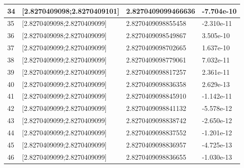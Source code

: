 \documentclass[a4paper, 11pt]{article}
\begin{document}
\begin{table}[H]
\begin{tabular}{llll}
\multicolumn{1}{|l|}{34} & \multicolumn{1}{l|}{{[}2.8270409098;2.8270409101{]}} & \multicolumn{1}{l|}{2.8270409099466636} & \multicolumn{1}{l|}{-7.704e-10} \\ \hline
\multicolumn{1}{|l|}{35} & \multicolumn{1}{l|}{{[}2.8270409098;2.8270409099{]}} & \multicolumn{1}{l|}{2.8270409098855458} & \multicolumn{1}{l|}{-2.310e-11} \\ \hline
\multicolumn{1}{|l|}{36} & \multicolumn{1}{l|}{{[}2.8270409098;2.8270409099{]}} & \multicolumn{1}{l|}{2.8270409098549867} & \multicolumn{1}{l|}{3.505e-10} \\ \hline
\multicolumn{1}{|l|}{37} & \multicolumn{1}{l|}{{[}2.8270409099;2.8270409099{]}} & \multicolumn{1}{l|}{2.8270409098702665} & \multicolumn{1}{l|}{1.637e-10} \\ \hline
\multicolumn{1}{|l|}{38} & \multicolumn{1}{l|}{{[}2.8270409099;2.8270409099{]}} & \multicolumn{1}{l|}{2.8270409098779061} & \multicolumn{1}{l|}{7.032e-11} \\ \hline
\multicolumn{1}{|l|}{39} & \multicolumn{1}{l|}{{[}2.8270409099;2.8270409099{]}} & \multicolumn{1}{l|}{2.8270409098817257} & \multicolumn{1}{l|}{2.361e-11} \\ \hline
\multicolumn{1}{|l|}{40} & \multicolumn{1}{l|}{{[}2.8270409099;2.8270409099{]}} & \multicolumn{1}{l|}{2.8270409098836358} & \multicolumn{1}{l|}{2.629e-13} \\ \hline
\multicolumn{1}{|l|}{41} & \multicolumn{1}{l|}{{[}2.8270409099;2.8270409099{]}} & \multicolumn{1}{l|}{2.8270409098845910} & \multicolumn{1}{l|}{-1.142e-11} \\ \hline
\multicolumn{1}{|l|}{42} & \multicolumn{1}{l|}{{[}2.8270409099;2.8270409099{]}} & \multicolumn{1}{l|}{2.8270409098841132} & \multicolumn{1}{l|}{-5.578e-12} \\ \hline
\multicolumn{1}{|l|}{43} & \multicolumn{1}{l|}{{[}2.8270409099;2.8270409099{]}} & \multicolumn{1}{l|}{2.8270409098838742} & \multicolumn{1}{l|}{-2.650e-12} \\ \hline
\multicolumn{1}{|l|}{44} & \multicolumn{1}{l|}{{[}2.8270409099;2.8270409099{]}} & \multicolumn{1}{l|}{2.8270409098837552} & \multicolumn{1}{l|}{-1.201e-12} \\ \hline
\multicolumn{1}{|l|}{45} & \multicolumn{1}{l|}{{[}2.8270409099;2.8270409099{]}} & \multicolumn{1}{l|}{2.8270409098836957} & \multicolumn{1}{l|}{-4.725e-13} \\ \hline
\multicolumn{1}{|l|}{46} & \multicolumn{1}{l|}{{[}2.8270409099;2.8270409099{]}} & \multicolumn{1}{l|}{2.8270409098836655} & \multicolumn{1}{l|}{-1.030e-13} \\ \hline

\end{tabular}
\end{table}
\end{document}
